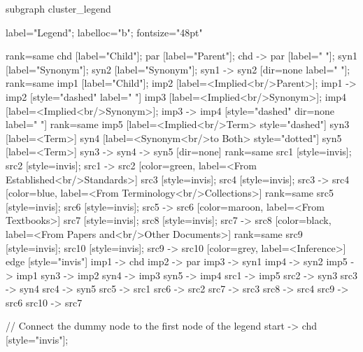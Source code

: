 \documentclass{article}
\begin{document}
{subgraph cluster_legend {

    label="Legend";
    labelloc="b";
    fontsize="48pt"

    {
        rank=same
        chd [label="Child"];
        par [label="Parent"];
        chd -> par [label="                "];
        syn1 [label="Synonym"];
        syn2 [label="Synonym"];
        syn1 -> syn2 [dir=none label="                "];
    }
    {
        rank=same
        imp1 [label="Child"];
        imp2 [label=<Implied<br/>Parent>];
        imp1 -> imp2 [style="dashed" label="                "]
        imp3 [label=<Implied<br/>Synonym>];
        imp4 [label=<Implied<br/>Synonym>];
        imp3 -> imp4 [style="dashed" dir=none label="                "]
    }
    {
        rank=same
        imp5 [label=<Implied<br/>Term> style="dashed"]
        syn3 [label=<Term>]
        syn4 [label=<Synonym<br/>to Both> style="dotted"]
        syn5 [label=<Term>]
        syn3 -> syn4 -> syn5 [dir=none]
    }
{
rank=same
src1 [style=invis];
src2 [style=invis];
src1 -> src2 [color=green, label=<From Established<br/>Standards>]
src3 [style=invis];
src4 [style=invis];
src3 -> src4 [color=blue, label=<From Terminology<br/>Collections>]
}
{
rank=same
src5 [style=invis];
src6 [style=invis];
src5 -> src6 [color=maroon, label=<From Textbooks>]
src7 [style=invis];
src8 [style=invis];
src7 -> src8 [color=black, label=<From Papers and<br/>Other Documents>]
}
{
rank=same
src9 [style=invis];
src10 [style=invis];
src9 -> src10 [color=grey, label=<Inference>]
}
edge [style="invis"]
imp1 -> chd
imp2 -> par
imp3 -> syn1
imp4 -> syn2
imp5 -> imp1
syn3 -> imp2
syn4 -> imp3
syn5 -> imp4
src1 -> imp5
src2 -> syn3
src3 -> syn4
src4 -> syn5
src5 -> src1
src6 -> src2
src7 -> src3
src8 -> src4
src9 -> src6
src10 -> src7
}

// Connect the dummy node to the first node of the legend
start -> chd [style="invis"];
}
\end{document}
